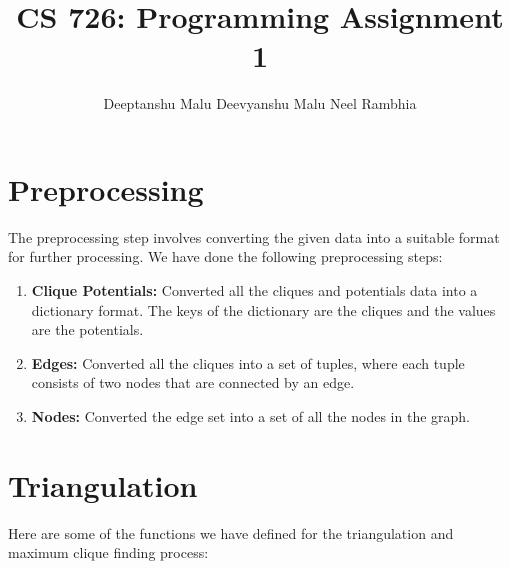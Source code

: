 \documentclass[12pt]{article}
\title{CS 726: Programming Assignment 1}
\author{Deeptanshu Malu \quad Deevyanshu Malu \quad Neel Rambhia}
\date{}
\begin{document}
\maketitle

\section{Preprocessing}

The preprocessing step involves converting the given data into a suitable format for further processing. We have done the following preprocessing steps:

\begin{enumerate}
    \item \textbf{Clique Potentials:} Converted all the cliques and potentials data into a dictionary format. The keys of the dictionary are the cliques and the values are the potentials. \item \textbf{Edges:} Converted all the cliques into a set of tuples, where each tuple consists of two nodes that are connected by an edge.
    \item \textbf{Nodes:} Converted the edge set into a set of all the nodes in the graph.
\end{enumerate}

\section{Triangulation}

Here are some of the functions we have defined for the triangulation and maximum clique finding process:
\end{document}
